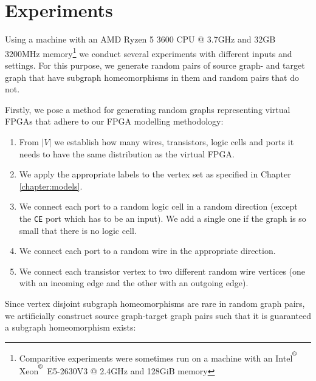 \chapter{Experiments}
\label{chapter:experiments}
Using a machine with an AMD Ryzen 5 3600 CPU @ 3.7GHz and 32GB 3200MHz memory\footnote{Comparitive experiments were sometimes run on a machine with an Intel$^\textsuperscript{\textregistered}$ Xeon$^\textsuperscript{\textregistered}$ E5-2630V3 @ 2.4GHz and 128GiB memory} we conduct several experiments with different inputs and settings. For this purpose, we generate random pairs of source graph- and target graph that have subgraph homeomorphisms in them and random pairs that do not.

Firstly, we pose a method for generating random graphs representing virtual FPGAs that adhere to our FPGA modelling methodology:

\begin{enumerate}
\item From $|V|$ we establish how many wires, transistors, logic cells and ports it needs to have the same distribution as the virtual FPGA.
\item We apply the appropriate labels to the vertex set as specified in Chapter \ref{chapter:models}.
\item We connect each port to a random logic cell in a random direction (except the \texttt{CE} port which has to be an input). We add a single one if the graph is so small that there is no logic cell.
\item We connect each port to a random wire in the appropriate direction.
\item We connect each transistor vertex to two different random wire vertices (one with an incoming edge and the other with an outgoing edge).
\end{enumerate}

Since vertex disjoint subgraph homeomorphisms are rare in random graph pairs, we artificially construct source graph-target graph pairs such that it is guaranteed a subgraph homeomorphism exists:

